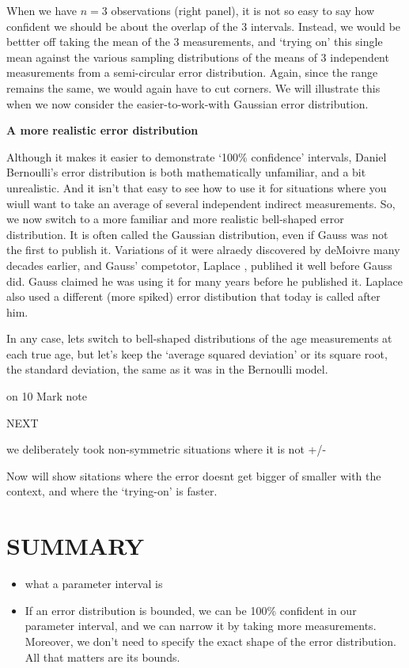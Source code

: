 \documentclass[]{book}
\begin{document}
When we have \(n = 3\) observations (right panel), it is not so easy to say how confident we should be about the overlap of the 3 intervals.
Instead, we would be bettter off taking the mean of the 3 measurements, and `trying on' this single mean against the various sampling distributions of the means of 3 independent measurements from a semi-circular error distribution. Again, since the range remains the same, we would again have to cut corners. We will illustrate this when we now consider the easier-to-work-with Gaussian error distribution.

\textbf{A more realistic error distribution}

Although it makes it easier to demonstrate `100\% confidence' intervals, Daniel Bernoulli's error distribution is both mathematically unfamiliar, and a bit unrealistic. And it isn't that easy to see how to use it for situations where you wiull want to take an average of several independent indirect measurements. So, we now switch to a more familiar and more realistic bell-shaped error distribution. It is often called the Gaussian distribution, even if Gauss was not the first to publish it. Variations of it were alraedy discovered by deMoivre many decades earlier, and Gauss' competotor, Laplace , publihed it well before Gauss did. Gauss claimed he was using it for many years before he published it.
Laplace also used a different (more spiked) error distibution that today is called after him.

In any case, lets switch to bell-shaped distributions of the age measurements at each true age, but let's keep the `average squared deviation' or its square root, the standard deviation, the same as it was in the Bernoulli model.

on 10 Mark note

NEXT

we deliberately took non-symmetric situations where it is not +/-

Now will show sitations where the error doesnt get bigger of smaller with the context, and where the `trying-on' is faster.

\hypertarget{summary-1}{%
\section{SUMMARY}\label{summary-1}}

\begin{itemize}
\item
  what a parameter interval is
\item
  If an error distribution is bounded, we can be 100\% confident in our parameter interval, and we can narrow it by taking more measurements. Moreover, we don't need to specify the exact shape of the error distribution. All that matters are its bounds.
\end{itemize}
\end{document}

